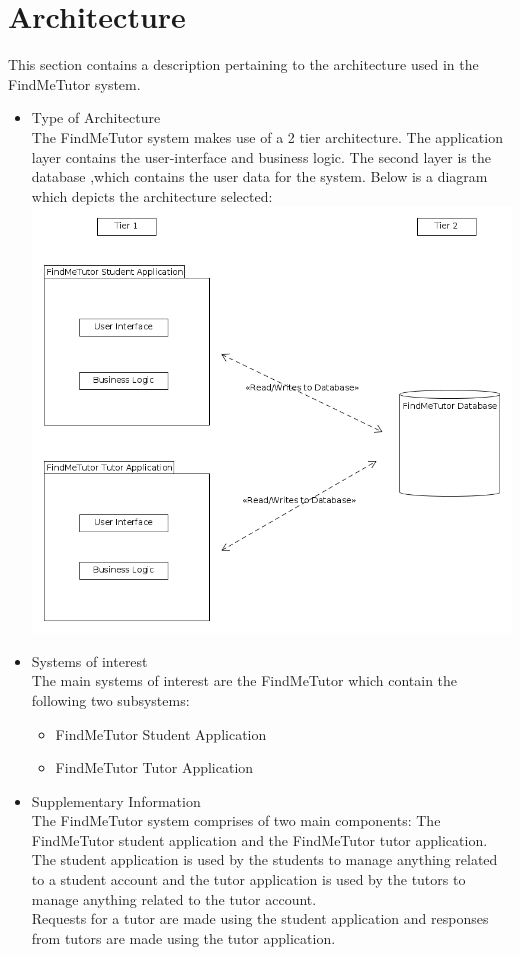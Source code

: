 \documentclass[12pt]{article}
\begin{document}

\section{Architecture}
This section contains a description pertaining to the architecture used in the FindMeTutor system.
\begin{itemize}
\item Type of Architecture\\
The FindMeTutor system makes use of a 2 tier architecture. The application layer contains the user-interface and business logic. The second layer is the database ,which contains the user data for the system. Below is a diagram which depicts the architecture selected:\\
\includegraphics[width=140mm]{./2_Tier_Diagram.png}\\
\item Systems of interest\\
The main systems of interest are the FindMeTutor which contain the following two subsystems:\\
\begin{itemize}
\item FindMeTutor Student Application\\
\item FindMeTutor Tutor Application\\
\end{itemize}
\item Supplementary Information\\
The FindMeTutor system comprises of two main components: The FindMeTutor student application and the FindMeTutor tutor application. The student application is used by the students to manage anything related to a student account and the tutor application is used by the tutors to manage anything related to the tutor account. \\
Requests for a tutor are made using the student application and responses from tutors are made using the tutor application.
\end{itemize}
\end{document}
